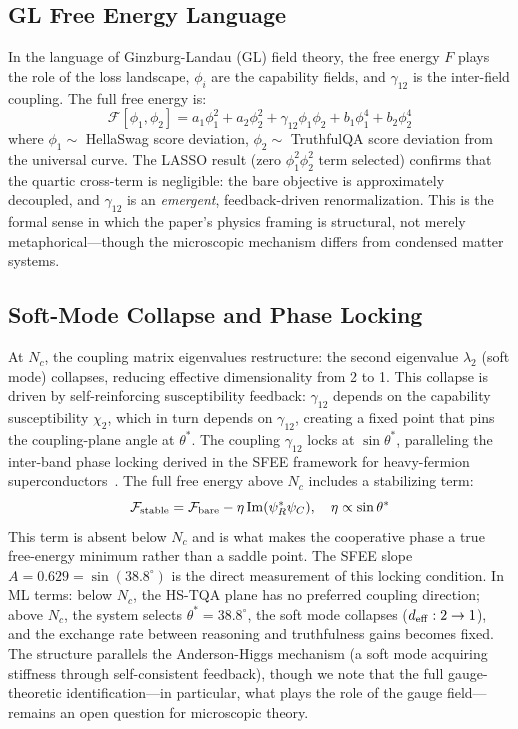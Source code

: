 \documentclass[11pt]{article}
\begin{document}
\subsection{GL Free Energy Language}

In the language of Ginzburg-Landau (GL) field theory, the free energy $F$ plays the role of the loss landscape, $\phi_i$ are the capability fields, and $\gamma_{12}$ is the inter-field coupling.
The full free energy is:
\begin{equation}
  \mathcal{F}[\phi_1, \phi_2] = a_1 \phi_1^2 + a_2 \phi_2^2 + \gamma_{12} \phi_1 \phi_2 + b_1 \phi_1^4 + b_2 \phi_2^4
\end{equation}
where $\phi_1 \sim$ HellaSwag score deviation, $\phi_2 \sim$ TruthfulQA score deviation from the universal curve.
The LASSO result (zero $\phi_1^2\phi_2^2$ term selected) confirms that the quartic cross-term is negligible: the bare objective is approximately decoupled, and $\gamma_{12}$ is an \emph{emergent}, feedback-driven renormalization.
This is the formal sense in which the paper's physics framing is structural, not merely metaphorical---though the microscopic mechanism differs from condensed matter systems.

\subsection{Soft-Mode Collapse and Phase Locking}

At $N_c$, the coupling matrix eigenvalues restructure: the second eigenvalue $\lambda_2$ (soft mode) collapses, reducing effective dimensionality from 2 to 1.
This collapse is driven by self-reinforcing susceptibility feedback: $\gamma_{12}$ depends on the capability susceptibility $\chi_2$, which in turn depends on $\gamma_{12}$, creating a fixed point that pins the coupling-plane angle at $\theta^*$.
The coupling $\gamma_{12}$ locks at $\sin\theta^*$, paralleling the inter-band phase locking derived in the SFEE framework for heavy-fermion superconductors~\cite{amin2020}.
The full free energy above $N_c$ includes a stabilizing term:
\begin{equation}
  \mathcal{F}_{\rm stable} = \mathcal{F}_{\rm bare} - \eta\,\mathrm{Im}(\psi_R^*\psi_C), \quad \eta \propto \sin\theta^*
\end{equation}
This term is absent below $N_c$ and is what makes the cooperative phase a true free-energy minimum rather than a saddle point.
The SFEE slope $A = 0.629 = \sin(38.8^\circ)$ is the direct measurement of this locking condition.
In ML terms: below $N_c$, the HS-TQA plane has no preferred coupling direction; above $N_c$, the system selects $\theta^*=38.8^\circ$, the soft mode collapses ($d_{\rm eff}: 2 \to 1$), and the exchange rate between reasoning and truthfulness gains becomes fixed.
The structure parallels the Anderson-Higgs mechanism (a soft mode acquiring stiffness through self-consistent feedback), though we note that the full gauge-theoretic identification---in particular, what plays the role of the gauge field---remains an open question for microscopic theory.
\end{document}
